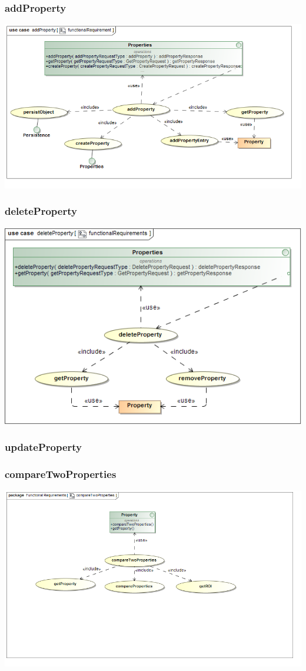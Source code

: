 \documentclass[a4paper,12pt]{article}
\begin{document}
\subsubsection{addProperty}
\includegraphics[width=1\textwidth]{./Images/requiredFunctionality/addProperty.png}
\subsubsection{deleteProperty}
\includegraphics[width=1\textwidth]{./Images/requiredFunctionality/deleteProperty.png}
\subsubsection{updateProperty}
\subsubsection{compareTwoProperties}
\includegraphics[width=1\textwidth]{./Images/requiredFunctionality/compareTwoProperties.png}
\end{document}
